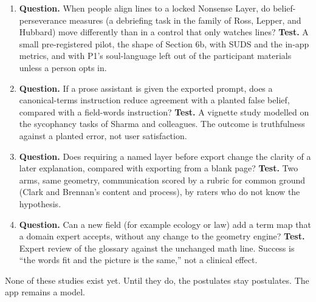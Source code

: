 \documentclass[11pt]{article}
\begin{document}
\begin{enumerate}[leftmargin=1.2em]
\item \textbf{Question.} When people align lines to a locked Nonsense Layer, do belief-perseverance measures (a debriefing task in the family of Ross, Lepper, and Hubbard) move differently than in a control that only watches lines? \textbf{Test.} A small pre-registered pilot, the shape of Section 6b, with SUDS and the in-app metrics, and with P1's soul-language left out of the participant materials unless a person opts in.
\item \textbf{Question.} If a prose assistant is given the exported prompt, does a canonical-terms instruction reduce agreement with a planted false belief, compared with a field-words instruction? \textbf{Test.} A vignette study modelled on the sycophancy tasks of Sharma and colleagues. The outcome is truthfulness against a planted error, not user satisfaction.
\item \textbf{Question.} Does requiring a named layer before export change the clarity of a later explanation, compared with exporting from a blank page? \textbf{Test.} Two arms, same geometry, communication scored by a rubric for common ground (Clark and Brennan's content and process), by raters who do not know the hypothesis.
\item \textbf{Question.} Can a new field (for example ecology or law) add a term map that a domain expert accepts, without any change to the geometry engine? \textbf{Test.} Expert review of the glossary against the unchanged math line. Success is ``the words fit and the picture is the same,'' not a clinical effect.
\end{enumerate}
None of these studies exist yet. Until they do, the postulates stay postulates. The app remains a model.
\end{document}
